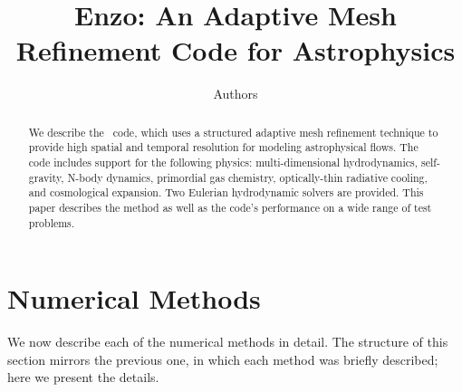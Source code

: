 \documentclass[onecolumn]{emulateapj}  %
\begin{document}
\title{Enzo: An Adaptive Mesh Refinement Code for Astrophysics}
\author{Authors}


\begin{abstract}
We describe the \enzo\ code, which uses a structured adaptive mesh refinement technique to provide high spatial and temporal resolution for modeling astrophysical flows.  The code includes support for the following physics: multi-dimensional hydrodynamics, self-gravity, N-body dynamics, primordial gas chemistry, optically-thin radiative cooling, and cosmological expansion.  Two Eulerian hydrodynamic solvers are provided.  This paper describes the method as well as the code's performance on a wide range of test problems.
\end{abstract}


\maketitle





\section{Numerical Methods}
\label{sec.methods}

We now describe each of the numerical methods in detail.  The structure of this section mirrors the previous one, in which each method was briefly described; here we present the details.









\end{document}
